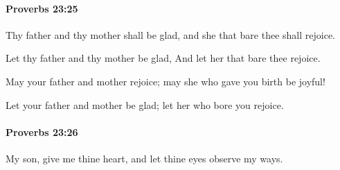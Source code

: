 		\paragraph{Proverbs 23:25} %
			\label{PROVERBS-23-25}

			Thy father and thy mother shall be glad, and she that bare thee shall rejoice.

			\begin{versebox}
					\item[BHS] 
					\item[ASV] Let thy father and thy mother be glad, And let her that bare thee rejoice.
					\item[NIV] May your father and mother rejoice; may she who gave you birth be joyful!
					\item[NRSV] Let your father and mother be glad; let her who bore you rejoice.
			\end{versebox}

		\paragraph{Proverbs 23:26} %
			\label{PROVERBS-23-26}

			My son, give me thine heart, and let thine eyes observe my ways.

